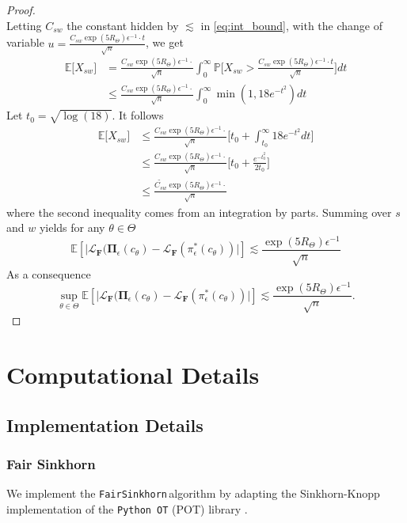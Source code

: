 \documentclass{article}
\newcommand{\fairsinkhorn}{\texttt{FairSinkhorn}\,}
\theoremstyle{definition}
\newcommand{\bbE}{\mathbb{E}}
\newcommand{\bbP}{\mathbb{P}}
\newcommand{\bfF}{\mathbf{F}}
\newcommand{\calL}{\mathcal{L}}
\begin{document}
\begin{proof}
$$    $$
    Letting $C_{sw}$ the constant hidden by $\lesssim$ in \eqref{eq:int_bound}, with the change of variable $u = \frac{C_{sw}\exp(5R_\Theta)\epsilon^{-1}\cdot t}{\sqrt{n}} $, we get
    \begin{align*}
        \bbE\big[X_{sw}\big] &= \frac{C_{sw}\exp(5R_\Theta)\epsilon^{-1}\cdot}{\sqrt{n}} \int_0^\infty \bbP\big[X_{sw}> \frac{C_{sw}\exp(5R_\Theta)\epsilon^{-1}\cdot t}{\sqrt{n}}\big]dt\\
        &\leq \frac{C_{sw}\exp(5R_\Theta)\epsilon^{-1}\cdot}{\sqrt{n}} \int_0^\infty \min(1, 18e^{-t^2})dt
    \end{align*}
    Let $t_0=\sqrt{\log(18)}$.
    It follows
    \begin{align*}
         \bbE\big[X_{sw}\big] &\leq \frac{C_{sw}\exp(5R_\Theta)\epsilon^{-1}\cdot}{\sqrt{n}}\big[t_0 + \int_{t_0}^\infty 18e^{-t^2} dt\big]\\
         &\leq \frac{C_{sw}\exp(5R_\Theta)\epsilon^{-1}\cdot}{\sqrt{n}}\big[t_0 + \frac{e^{-t_0^2}}{2t_0}\big]\\
         &\leq \frac{\tilde{C_{sw}}\exp(5R_\Theta)\epsilon^{-1}\cdot}{\sqrt{n}}
    \end{align*}
    where the second inequality comes from an integration by parts.
    Summing over $s$ and $w$ yields for any $\theta\in\Theta$
    $$
        \bbE[\lvert\calL_{\bfF}(\mathbf{\Pi}_\epsilon(c_\theta) - \calL_{\bfF}(\pi^*_\epsilon(c_\theta))\rvert] \lesssim  \frac{\exp(5R_\Theta)\epsilon^{-1}}{\sqrt{n}}
    $$
    As a consequence
    $$
        \sup_{\theta\in\Theta}\bbE[\lvert\calL_{\bfF}(\mathbf{\Pi}_\epsilon(c_\theta) - \calL_{\bfF}(\pi^*_\epsilon(c_\theta))\rvert] \lesssim  \frac{\exp(5R_\Theta)\epsilon^{-1}}{\sqrt{n}}.
    $$
\end{proof}
\section{Computational Details}\label{sec:impl_details}
\subsection{Implementation Details}
\subsubsection{Fair Sinkhorn}
We implement the \fairsinkhorn algorithm by adapting the Sinkhorn-Knopp \citep{Sinkhorn1967} implementation of the \texttt{Python OT} (POT) library \citep{flamary2021pot, flamary2024pot}.
\end{document}

